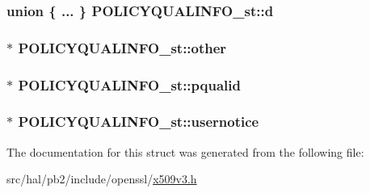 \subsubsection[{\texorpdfstring{d}{d}}]{\setlength{\rightskip}{0pt plus 5cm}union \{ ... \}   P\+O\+L\+I\+C\+Y\+Q\+U\+A\+L\+I\+N\+F\+O\+\_\+st\+::d}\hypertarget{struct_p_o_l_i_c_y_q_u_a_l_i_n_f_o__st_a1e0dd937427fb6f1b5fc1c39c74e0760}{}\label{struct_p_o_l_i_c_y_q_u_a_l_i_n_f_o__st_a1e0dd937427fb6f1b5fc1c39c74e0760}
\subsubsection[{\texorpdfstring{other}{other}}]{$\ast$ P\+O\+L\+I\+C\+Y\+Q\+U\+A\+L\+I\+N\+F\+O\+\_\+st\+::other}\hypertarget{struct_p_o_l_i_c_y_q_u_a_l_i_n_f_o__st_a44e162a24d6bcef3010feda880547deb}{}\label{struct_p_o_l_i_c_y_q_u_a_l_i_n_f_o__st_a44e162a24d6bcef3010feda880547deb}
\subsubsection[{\texorpdfstring{pqualid}{pqualid}}]{$\ast$ P\+O\+L\+I\+C\+Y\+Q\+U\+A\+L\+I\+N\+F\+O\+\_\+st\+::pqualid}\hypertarget{struct_p_o_l_i_c_y_q_u_a_l_i_n_f_o__st_a88696c938a44a9aa5d6eeb4b326beb10}{}\label{struct_p_o_l_i_c_y_q_u_a_l_i_n_f_o__st_a88696c938a44a9aa5d6eeb4b326beb10}
\subsubsection[{\texorpdfstring{usernotice}{usernotice}}]{$\ast$ P\+O\+L\+I\+C\+Y\+Q\+U\+A\+L\+I\+N\+F\+O\+\_\+st\+::usernotice}\hypertarget{struct_p_o_l_i_c_y_q_u_a_l_i_n_f_o__st_aea186ea8d0b5f7c84f0f53ea0f3f6d4e}{}\label{struct_p_o_l_i_c_y_q_u_a_l_i_n_f_o__st_aea186ea8d0b5f7c84f0f53ea0f3f6d4e}


The documentation for this struct was generated from the following file\+:\begin{DoxyCompactItemize}
\item 
src/hal/pb2/include/openssl/\hyperlink{x509v3_8h}{x509v3.\+h}\end{DoxyCompactItemize}
